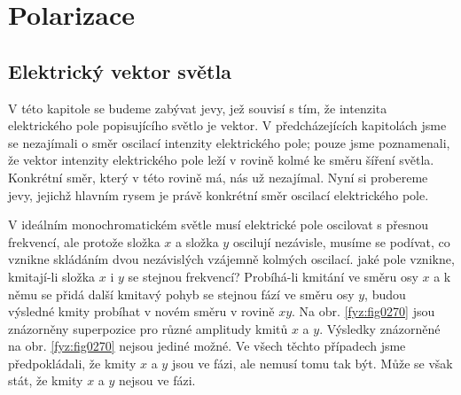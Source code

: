 \setchaptertoc
\chapter{Polarizace}\label{fyz:IchapXXXIII}
  \section{Elektrický vektor světla}\label{fyz:IchapXXXIIIsecI}
    V této kapitole se budeme zabývat jevy, jež souvisí s tím, že intenzita elektrického pole
    popisujícího světlo je vektor. V předcházejících kapitolách jsme se nezajímali o směr oscilací
    intenzity elektrického pole; pouze jsme poznamenali, že vektor intenzity elektrického pole leží
    v rovině kolmé ke směru šíření světla. Konkrétní směr, který v této rovině má, nás už nezajímal.
    Nyní si probereme jevy, jejichž hlavním rysem je právě konkrétní směr oscilací elektrického
    pole.

    V ideálním monochromatickém světle musí elektrické pole oscilovat s přesnou frekvencí, ale
    protože složka \(x\) a složka \(y\) oscilují nezávisle, musíme se podívat, co vznikne skládáním
    dvou nezávislých vzájemně kolmých oscilací. jaké pole vznikne, kmitají-li složka \(x\) i \(y\)
    se stejnou frekvencí? Probíhá-li kmitání ve směru osy \(x\) a k němu se přidá další kmitavý
    pohyb se stejnou fází ve směru osy \(y\), budou výsledné kmity probíhat v novém směru v rovině
    \(xy\). Na obr. \ref{fyz:fig0270} jsou znázorněny superpozice pro různé amplitudy kmitů \(x\) a
    \(y\). Výsledky znázorněné na obr. \ref{fyz:fig0270} nejsou jediné možné. Ve všech těchto
    případech jsme předpokládali, že kmity \(x\) a \(y\) jsou ve fázi, ale nemusí tomu tak být. Může
    se však stát, že kmity \(x\) a \(y\) nejsou ve fázi.

